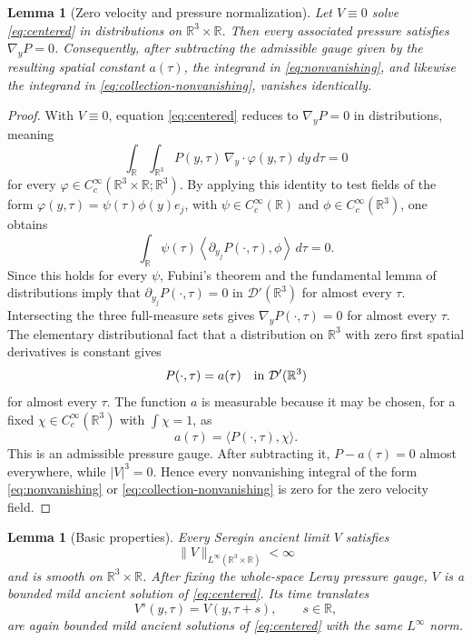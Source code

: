 \documentclass[11pt]{amsart}
\theoremstyle{plain}
\newtheorem{lemma}[theorem]{Lemma}
\theoremstyle{definition}
\theoremstyle{remark}
\numberwithin{equation}{section}
\begin{document}
\begin{lemma}[Zero velocity and pressure normalization]\label{lem:zero-pressure}
Let \(V\equiv0\) solve \eqref{eq:centered} in distributions on
\(\mathbb R^3\times\mathbb R\).  Then every associated pressure satisfies
\(\nabla_yP=0\).  Consequently, after subtracting the admissible gauge
given by the resulting spatial constant \(a(\tau)\), the integrand in
\eqref{eq:nonvanishing}, and likewise the integrand in
\eqref{eq:collection-nonvanishing}, vanishes identically.
\end{lemma}

\begin{proof}
With \(V\equiv0\), equation \eqref{eq:centered} reduces to
\(\nabla_yP=0\) in distributions, meaning
\[
   \int_{\mathbb R}\int_{\mathbb R^3}P(y,\tau)\,\nabla_y\cdot\varphi(y,\tau)
      \,dy\,d\tau=0
\]
for every \(\varphi\in C_c^\infty(\mathbb R^3\times\mathbb R;\mathbb R^3)\).
By applying this identity to test fields of the form
\(\varphi(y,\tau)=\psi(\tau)\phi(y)e_j\), with
\(\psi\in C_c^\infty(\mathbb R)\) and
\(\phi\in C_c^\infty(\mathbb R^3)\), one obtains
\[
   \int_{\mathbb R}\psi(\tau)
      \left\langle \partial_{y_j}P(\cdot,\tau),\phi\right\rangle
      \,d\tau=0 .
\]
Since this holds for every \(\psi\), Fubini's theorem and the fundamental
lemma of distributions imply that
\(\partial_{y_j}P(\cdot,\tau)=0\) in \(\mathcal D'(\mathbb R^3)\) for almost
every \(\tau\).  Intersecting the three full-measure sets gives
\(\nabla_yP(\cdot,\tau)=0\) for almost every \(\tau\).  The elementary
distributional fact that a distribution on \(\mathbb R^3\) with zero first
spatial derivatives is constant gives
\[
   P(\cdot,\tau)=a(\tau)\quad\hbox{in }\mathcal D'(\mathbb R^3)
\]
for almost every \(\tau\).  The function \(a\) is measurable because it may be
chosen, for a fixed \(\chi\in C_c^\infty(\mathbb R^3)\) with
\(\int\chi=1\), as
\[
   a(\tau)=\langle P(\cdot,\tau),\chi\rangle .
\]
This is an admissible pressure gauge.  After subtracting it,
\(P-a(\tau)=0\) almost everywhere, while \(|V|^3=0\).  Hence every
nonvanishing integral of the form \eqref{eq:nonvanishing} or
\eqref{eq:collection-nonvanishing} is zero for the zero velocity field.
\end{proof}

\begin{lemma}[Basic properties]\label{lem:basic-properties}
Every Seregin ancient limit \(V\) satisfies
\[
   \|V\|_{L^\infty(\mathbb R^3\times\mathbb R)}<\infty
\]
and is smooth on \(\mathbb R^3\times\mathbb R\).  After fixing the whole-space
Leray pressure gauge, \(V\) is a bounded mild ancient solution of
\eqref{eq:centered}.  Its time translates
\[
   V^s(y,\tau)=V(y,\tau+s),\qquad s\in\mathbb R,
\]
are again bounded mild ancient solutions of \eqref{eq:centered} with the same
\(L^\infty\) norm.
\end{lemma}
\end{document}

